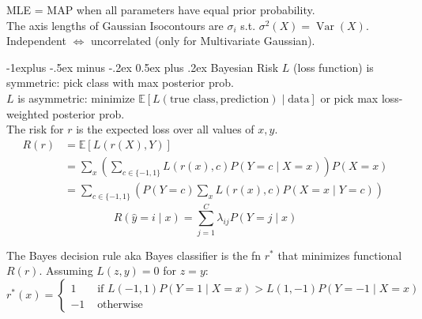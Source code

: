 \documentclass[10pt,landscape]{article}
\makeatletter
\DeclareMathOperator*{\Var}{Var}
\newcommand{\wrap}[3]{\left#1#3\right#2}
\def\E{\mathbb{E}}
\renewcommand{\subsection}{\@startsection{subsection}{2}{0mm}%
                                {-1explus -.5ex minus -.2ex}%
                                {0.5ex plus .2ex}%
                                {\normalfont\normalsize\bfseries}}
\makeatother
\begin{document}
\begin{multicols}{3}
MLE = MAP when all parameters have equal prior probability.
\\
The axis lengths of Gaussian Isocontours are $\sigma_i$ s.t. $\sigma^2(X)=\Var(X)$.
Independent $\Longleftrightarrow$ uncorrelated (only for Multivariate Gaussian).




\subsection{Bayesian Risk}
$L$ (loss function) is symmetric: pick class with max posterior prob.
\\
$L$ is asymmetric: minimize $\E[L(\text{true class}, \text{prediction}) \mid \text{data}]$ or pick max loss-weighted posterior prob.
\\

The risk for $r$ is the expected loss over all values of $x, y$.
{\small
  \begin{align*}
    R(r) &=\E[L(r(X), Y)] \\
    &=\sum_{x}\wrap(){\sum_{c\in\{-1,1\}} L(r(x), c) P(Y=c \mid X=x)} P(X=x) \\
    &=\sum_{c\in\{-1,1\}}\wrap(){ P(Y=c) \sum_{x} L(r(x), c) P(X=x \mid Y=c)}
  \end{align*}
}
\[
    R(\hat{y}=i \mid x)=\sum_{j=1}^{C} \lambda_{i j} P(Y=j \mid x)
\]

The Bayes decision rule aka Bayes classifier is the fn $r^{*}$ that minimizes functional $R(r)$. Assuming $L(z, y)=0$ for $z=y$:
{\scriptsize \[
r^{*}(x)=\left\{\begin{aligned}
1 & \text { if } L(-1,1) P(Y=1 \mid X=x)>L(1,-1) P(Y=-1 \mid X=x) \\
-1 & \text { otherwise }
\end{aligned}\right.
\]}



\end{multicols}
\end{document}
